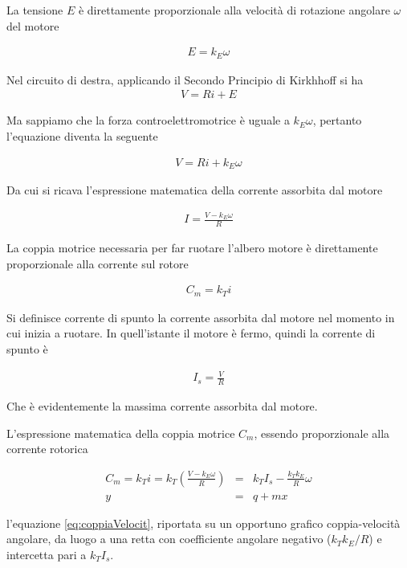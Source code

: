 \documentclass[17pt]{extarticle}
\begin{document}
La tensione $E$ è direttamente proporzionale alla velocità di rotazione angolare $\omega$ del motore

\begin{eqnarray}\label{eq:controEM}
	E = k_E\omega
\end{eqnarray}

Nel circuito di destra, applicando il Secondo Principio di Kirkhhoff si ha 
\begin{eqnarray}
	V = Ri + E
\end{eqnarray}

Ma sappiamo che la forza controelettromotrice è uguale a $k_E\omega$, pertanto l'equazione diventa la seguente

\begin{eqnarray}
	V = Ri + k_E\omega
\end{eqnarray}

Da cui si ricava l'espressione matematica della corrente assorbita dal motore

\begin{eqnarray}
	I = \frac{V-k_E\omega}{R}
\end{eqnarray}

La coppia motrice necessaria per far ruotare l'albero motore è direttamente proporzionale alla corrente sul rotore

\begin{eqnarray}
	C_m = k_Ti
\end{eqnarray}


Si definisce corrente di spunto la corrente assorbita dal motore nel momento in cui inizia a ruotare. In quell'istante il motore è fermo, quindi la corrente di spunto è

\begin{eqnarray}
	I_s = \frac{V}{R}
\end{eqnarray}

Che è evidentemente la massima corrente assorbita dal motore.

L'espressione matematica della coppia motrice $C_m$, essendo proporzionale alla corrente rotorica 

\begin{eqnarray}\label{eq:coppiaVelocit}
	C_m = k_Ti = k_T\left( \frac{V-k_E\omega}{R} \right) & = & k_TI_s- \frac{k_Tk_E}{R}\omega  \\ \nonumber
	y & = & q +  mx 
\end{eqnarray}

l'equazione \ref{eq:coppiaVelocit}, riportata su un opportuno grafico coppia-velocità angolare, da luogo a una retta con coefficiente angolare negativo ($k_Tk_E/R$) e intercetta pari a $k_TI_s$.
\end{document}
